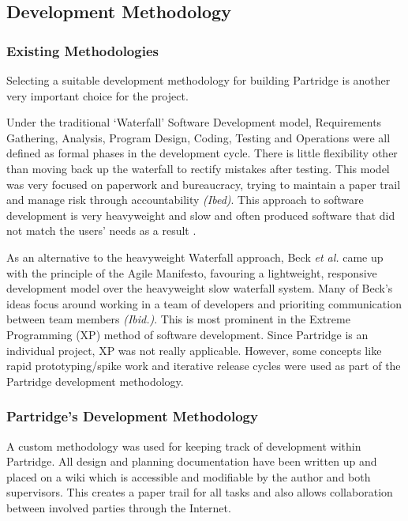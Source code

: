 \subsection{Development Methodology}

\subsubsection{Existing Methodologies}
Selecting a suitable development methodology for building Partridge is another
very important choice for the project.

Under the traditional `Waterfall' Software Development model, Requirements
Gathering, Analysis, Program Design, Coding, Testing and Operations were all
defined as formal phases in the development cycle. There is little flexibility
other than moving back up the waterfall to rectify mistakes after
testing\cite{Royce:1987:MDL:41765.41801}. This model was very focused on
paperwork and bureaucracy, trying to maintain a paper trail and manage risk
through accountability \emph{(Ibed)}. This approach to software development is
very heavyweight and slow and often produced software that did not match the
users' needs as a result \cite{Boehm1988}.

As an alternative to the heavyweight Waterfall approach, Beck \emph{et al.} came up
with the principle of the Agile Manifesto, favouring a lightweight, responsive
development model over the heavyweight slow waterfall
system\cite{beck2001agile}. Many of Beck's ideas focus around working in a team
of developers and prioriting communication between team members \emph{(Ibid.)}.
This is most prominent in the Extreme Programming (XP) method of software
development. Since Partridge is an individual project, XP was not really
applicable. However, some concepts like rapid prototyping/spike work and
iterative release cycles were used as part of the Partridge development
methodology.

\subsubsection{ Partridge's Development Methodology}

A custom methodology was used for keeping track of development within
Partridge.  All design and planning documentation have been written up and
placed on a wiki which is accessible and modifiable by the author and both
supervisors. This creates a paper trail for all tasks and also allows
collaboration between involved parties through the Internet.

